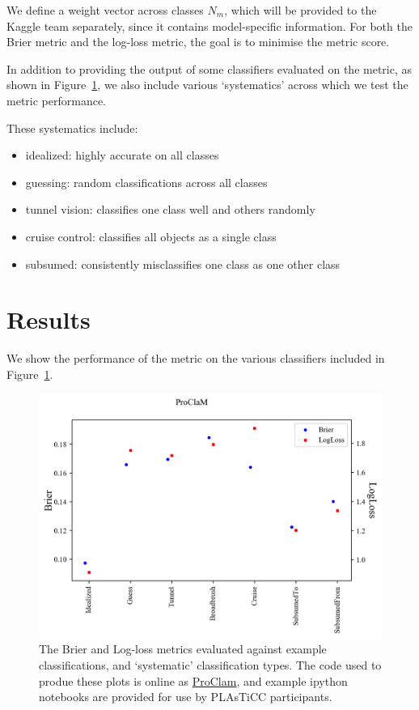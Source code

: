 \documentclass[\docopts]{\docclass}
\begin{document}
\begin{itemize}
We define a weight vector across classes $N_m$, which will be provided to the Kaggle team separately, since it contains model-specific information. For both the Brier metric and the log-loss metric, the goal is to minimise the metric score.

In addition to providing the output of some classifiers evaluated on the metric, as shown in Figure~\ref{fig:ProClam}, we also include various `systematics' across which we test the metric performance.

These systematics include:

\begin{itemize}
\item idealized: highly accurate on all classes
\item guessing: random classifications across all classes
\item tunnel vision: classifies one class well and others randomly
\item cruise control: classifies all objects as a single class
\item subsumed: consistently misclassifies one class as one other class
\end{itemize}

\section{Results}
\label{sec:results}


We show the performance of the metric on the various classifiers included in Figure~\ref{fig:ProClam}.

\begin{figure}[htbp!]
\begin{center}
 \includegraphics[width=0.95\linewidth,angle=0]{figures/ProClaM_results.png}
\caption{\label{fig:ProClam} The Brier and Log-loss metrics evaluated against example classifications, and `systematic' classification types. The code used to produe these plots is online as \href{https://github.com/aimalz/proclam/}{ProClam}, and example ipython notebooks are provided for use by PLAsTiCC participants.}
\end{center}
\end{figure}



\end{itemize}
\end{document}
